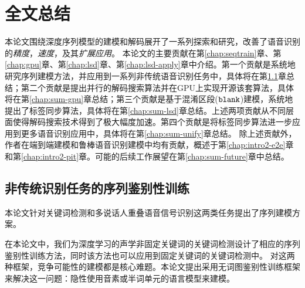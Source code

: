 
\chapter{全文总结}
\label{chap:sum}

本论文围绕深度序列模型的建模和解码展开了一系列探索和研究，改善了语音识别的{\em 精度}，{\em 速度}，及其{\em 扩展应用}。
本论文的主要贡献在第\ref{chap:seqtrain}章、第\ref{chap:gpu}章、第\ref{chap:lsd}章、第\ref{chap:lsd-apply}章中介绍。第一个贡献是系统地研究序列建模方法，并应用到一系列非传统语音识别任务中，具体将在第\ref{chap:sum-kws}章总结；第二个贡献是提出并行的解码搜索算法并在GPU上实现开源该套算法，具体将在第\ref{chap:sum-gpu}章总结；第三个贡献是基于混淆区段($\tt blank$)建模，系统地提出了标签同步算法，具体将在第\ref{chap:sum-lsd}章总结。上述两项贡献从不同层面使得解码搜索技术得到了极大幅度加速。第四个贡献是将标签同步算法进一步应用到更多语音识别应用中，具体将在第\ref{chap:sum-unify}章总结。
除上述贡献外，作者在端到端建模和鲁棒语音识别建模中均有贡献，概述于第\ref{chap:intro2-e2e}章和第\ref{chap:intro2-pit}章。可能的后续工作展望在第\ref{chap:sum-future}章中总结。


\section{非传统识别任务的序列鉴别性训练}
\label{chap:sum-kws}

本论文针对关键词检测和多说话人重叠语音信号识别这两类任务提出了序列建模方案。

在本论文中，我们为深度学习的声学非固定关键词的关键词检测设计了相应的序列鉴别性训练方法，同时该方法也可以应用到固定关键词的关键词检测中。
%
对这两种框架，竞争可能性的建模都是核心难题。本论文提出采用无词图鉴别性训练框架来解决这一问题：隐性使用音素或半词单元的语言模型来建模。



